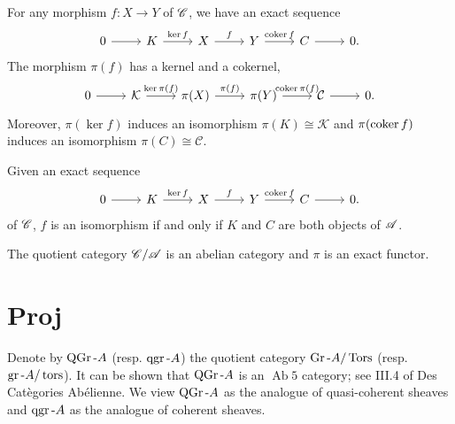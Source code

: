 \documentclass[dissertation.tex]{subfiles}
\begin{document}
\begin{lem}
  For any morphism $f \colon X \rightarrow Y$ of $\mathscr{C}$, we have an exact sequence 
  $$\begin{tikzcd}
    0 \arrow{r} & K \arrow{r}{\ker{f}} & X \arrow{r}{f} & Y \arrow{r}{\coker{f}} & C \arrow{r} & 0.
  \end{tikzcd}$$ 
  The morphism $\pi(f)$ has a kernel and a cokernel,
  $$\begin{tikzcd}
    0 \arrow{r} & \mathcal{K} \arrow{r}{\ker{\pi(f)}} & \pi(X) \arrow{r}{\pi(f)} & \pi(Y) \arrow{r}{\coker{\pi(f)}} & \mathcal{C} \arrow{r} & 0.
  \end{tikzcd}$$
  Moreover, $\pi(\ker{f})$ induces an isomorphism $\pi(K) \cong \mathcal{K}$ and $\pi(\operatorname{coker}{f})$ induces an isomorphism $\pi(C) \cong \mathcal{C}$.
\end{lem}

\begin{lem}
  Given an exact sequence 
  $$\begin{tikzcd}
    0 \arrow{r} & K \arrow{r}{\ker{f}} & X \arrow{r}{f} & Y \arrow{r}{\coker{f}} & C \arrow{r} & 0.
  \end{tikzcd}$$ 
  of $\mathscr{C}$, $f$ is an isomorphism if and only if $K$ and $C$ are both objects of $\mathscr{A}$.
\end{lem}

\begin{prop}
  The quotient category $\mathscr{C}/\mathscr{A}$ is an abelian category and $\pi$ is an exact functor.
\end{prop}

\section{Proj}
Denote by $\operatorname{QGr}\text{-}A$ (resp. $\operatorname{qgr}\text{-}A$) the quotient category $\operatorname{Gr}\text{-}A/\operatorname{Tors}$ (resp. $\operatorname{gr}\text{-}A/\operatorname{tors}$).
It can be shown that $\operatorname{QGr}\text{-}A$ is an $\operatorname{Ab} 5$ category; see III.4 of Des Cat\`{e}gories Ab\'{e}lienne.
We view $\operatorname{QGr}\text{-}A$ as the analogue of quasi-coherent sheaves and $\operatorname{qgr}\text{-}A$ as the analogue of coherent sheaves.
\end{document}
